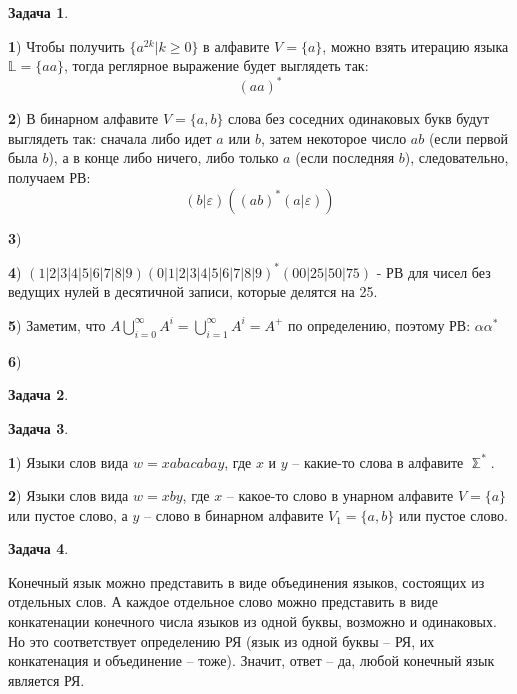 \documentclass[12pt]{article}
\theoremstyle{definition}
\newtheorem{task}{Задача}
\begin{document}
\begin{task}
\textit{}

\textbf{1}) Чтобы получить $\{ a^{2k}| k \geqslant 0 \}$ в алфавите $V = \{a\}$, можно взять итерацию языка $\mathbb{L} = \{aa\}$, тогда реглярное выражение будет выглядеть так: \[(aa)^*\] 

\textbf{2}) В бинарном алфавите $V = \{a,b\}$ слова без соседних одинаковых букв будут выглядеть так: сначала либо идет $a$ или $b$, затем некоторое число $ab$ (если первой была $b$), а в конце  либо ничего, либо только $a$ (если последняя $b$), следовательно, получаем РВ: \[ (b|\varepsilon)((ab)^*(a|\varepsilon)) \] 

\textbf{3})

\textbf{4}) $ (1|2|3|4|5|6|7|8|9)(0|1|2|3|4|5|6|7|8|9)^*
(00|25|50|75)$ - РВ для чисел без ведущих нулей в десятичной записи, которые делятся на 25. 

\textbf{5}) Заметим, что $A \bigcup\limits_{i=0}^{\infty} A^i = \bigcup\limits_{i=1}^{\infty} A^i = A^+$ по определению, поэтому РВ: $\alpha\alpha^*$

\textbf{6})

\end{task}



\begin{task}
\textbf{}

\end{task}





\begin{task}
\textbf{}

\textbf{1}) Языки слов вида $w = xabacabay$, где $x$ и $y$ -- какие-то слова в алфавите $\mathbb{\sum}^*$.

\textbf{2}) Языки слов вида $w = xby$, где $x$ -- какое-то слово в унарном алфавите $V = \{a\}$ или пустое слово, а $y$ -- слово в бинарном алфавите $V_1 = \{a, b\}$ или пустое слово. 
\end{task}



\begin{task}
\textbf{}

Конечный язык можно представить в виде объединения языков, состоящих из отдельных слов. А каждое отдельное слово можно представить в виде конкатенации конечного числа языков из одной буквы, возможно и одинаковых. Но это соответствует определению РЯ (язык из одной буквы -- РЯ, их конкатенация и объединение -- тоже). Значит, ответ -- да, любой конечный язык является РЯ. 

\end{task}
\end{document}
